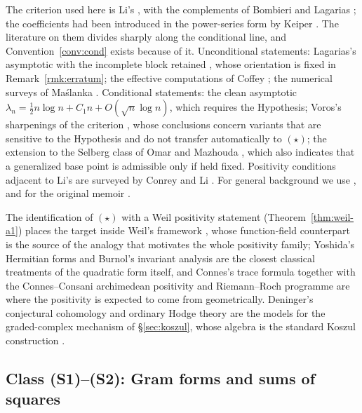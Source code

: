 \documentclass[11pt]{amsart}
\theoremstyle{definition}
\theoremstyle{remark}
\theoremstyle{definition}
\begin{document}
The criterion used here is Li's \cite{Li1997}, with the complements of Bombieri and
Lagarias \cite{BombieriLagarias1999}; the coefficients had been introduced in the power-series form
by Keiper \cite{Keiper1992}. The literature on them divides sharply along the conditional line, and
Convention~\ref{conv:cond} exists because of it. Unconditional statements: Lagarias's asymptotic
with the incomplete block retained \cite{Lagarias2007}, whose orientation is fixed in
Remark~\ref{rmk:erratum}; the effective computations of Coffey \cite{Coffey2005,Coffey2008}; the
numerical surveys of Ma\'slanka \cite{Maslanka}. Conditional statements: the clean asymptotic
$\lambda_n=\tfrac12n\log n+C_1n+O(\sqrt n\log n)$, which requires the Hypothesis; Voros's
sharpenings of the criterion \cite{Voros2006,VorosBook}, whose conclusions concern variants that are
sensitive to the Hypothesis and do not transfer automatically to $(\star)$; the extension to the
Selberg class of Omar and Mazhouda \cite{OmarMazhouda}, which also indicates that a generalized base
point is admissible only if held fixed. Positivity conditions adjacent to Li's are surveyed by
Conrey and Li \cite{ConreyLi}. For general background we use \cite{Titchmarsh,Edwards,Ivic,
Davenport,MontgomeryVaughan,IwaniecKowalski,ConreyNotices,Bombieri,Sarnak}, and for the original
memoir \cite{Riemann}.

The identification of $(\star)$ with a Weil positivity statement
(Theorem~\ref{thm:weil-a1}) places the target inside Weil's framework \cite{Weil1952}, whose
function-field counterpart \cite{Weil1948,Deligne} is the source of the analogy that motivates the
whole positivity family; Yoshida's Hermitian forms \cite{Yoshida} and Burnol's invariant analysis
\cite{Burnol} are the closest classical treatments of the quadratic form itself, and Connes's trace
formula \cite{connes1999} together with the Connes--Consani archimedean positivity
\cite{ConnesConsani2021} and Riemann--Roch programme \cite{ConnesConsaniRR} are where the
positivity is expected to come from geometrically. Deninger's conjectural cohomology
\cite{Deninger} and ordinary Hodge theory \cite{Voisin} are the models for the graded-complex
mechanism of \S\ref{sec:koszul}, whose algebra is the standard Koszul construction
\cite{Eisenbud}.

\subsection{Class (S1)--(S2): Gram forms and sums of squares}
\end{document}
